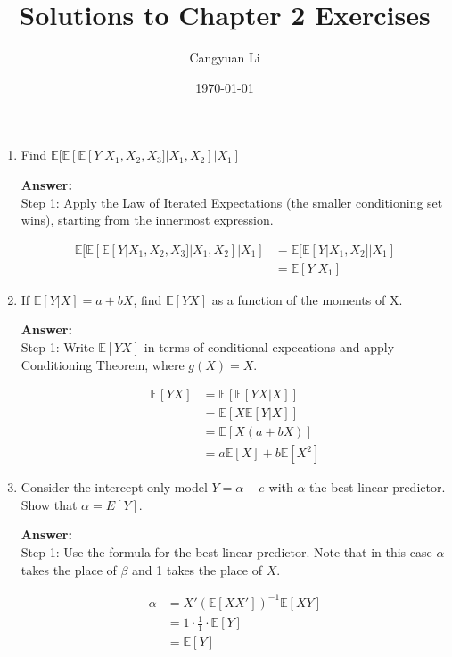 \documentclass[14pt]{extreport}
\title{Solutions to Chapter 2 Exercises}
\author{Cangyuan Li}
\date{\today}
\newcommand{\answer}[0]{\medskip \textbf{Answer:} \medskip \\}
\begin{document}
\maketitle

\begin{enumerate}
    \item [\textbf{2.01}] Find \(
        \mathbb{E}[
            \mathbb{E}[
                \mathbb{E}[Y | X_1, X_2, X_3]
            | X_1, X_2] 
        | X_1]
    \)

    \answer
    Step 1: Apply the Law of Iterated Expectations (the smaller conditioning set wins), 
    starting from the innermost expression.

    \begin{align*}
        \mathbb{E}[\mathbb{E}[\mathbb{E}[Y | X_1, X_2, X_3] | X_1, X_2] | X_1] &= 
        \mathbb{E}[\mathbb{E}[Y | X_1, X_2] | X_1] \\
         &= \mathbb{E}[Y | X_1]
    \end{align*}


    \item [\textbf{2.02}] If \(\mathbb{E}[Y | X] = a + bX\), find \(\mathbb{E}[YX]\) as a function of the moments of X.
    
    \answer
    Step 1: Write \(\mathbb{E}[YX]\) in terms of conditional expecations and apply Conditioning Theorem, where \(g(X) = X\).

    \begin{align*}
        \mathbb{E}[YX] &= \mathbb{E}[\mathbb{E}[YX | X]] \\
        &= \mathbb{E}[X \mathbb{E}[Y | X]] \\
        &= \mathbb{E}[X (a + bX)] \\
        &= a\mathbb{E}[X] + b\mathbb{E}[X^2]
    \end{align*}


    \item [\textbf{2.15}] Consider the intercept-only model \(Y = \alpha + e\) with \(\alpha\) the best linear predictor. Show that \(\alpha = E[Y]\).
    
    \answer
    Step 1: Use the formula for the best linear predictor. Note that in this case \( \alpha \) takes the place of \( \beta \) and 1 takes the place of \( X \).
    
    \begin{align*}
        \alpha &= X'\left(\mathbb{E}[XX']\right)^{-1}\mathbb{E}[XY] \\
        &= 1 \cdot \frac{1}{1} \cdot \mathbb{E}[Y] \\
        &= \mathbb{E}[Y]
    \end{align*}



\end{enumerate}
\end{document}

